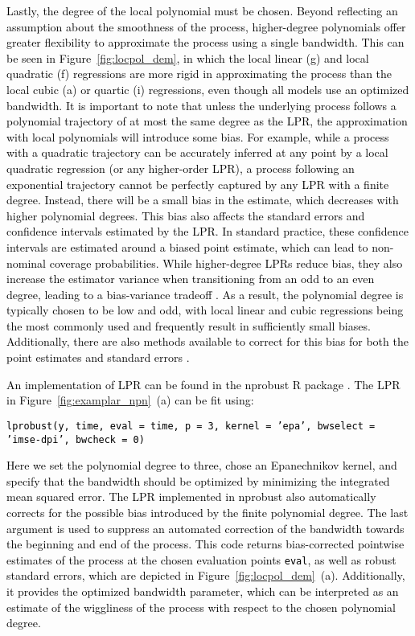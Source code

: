 \documentclass[man, floatsintext]{apa7}
\begin{document}
\textcolor{black}{
  Lastly, the degree of the local polynomial must be chosen. Beyond reflecting
  an assumption about the smoothness of the process, higher-degree polynomials
  offer greater flexibility to approximate the process using a single
  bandwidth. This can be seen in Figure~\ref{fig:locpol_dem}, in which the
  local linear (g) and local quadratic (f) regressions are more rigid in
  approximating the process than the local cubic (a) or quartic (i)
  regressions, even though all models use an optimized bandwidth. It is
  important to note that unless the underlying process follows a polynomial
  trajectory of at most the same degree as the LPR, the approximation with
  local polynomials will introduce some bias. For example, while a process with
  a quadratic trajectory can be accurately inferred at any point by a local
  quadratic regression (or any higher-order LPR), a process following an
  exponential trajectory cannot be perfectly captured by any LPR with a finite
  degree. Instead, there will be a small bias in the estimate, which decreases
  with higher polynomial degrees. This bias also affects the
  standard errors and confidence intervals estimated by the LPR\@. In standard
  practice, these confidence intervals are estimated around a biased point
  estimate, which can lead to non-nominal coverage probabilities. While
  higher-degree LPRs reduce bias, they also increase the estimator variance
  when transitioning from an odd to an even degree, leading to a bias-variance
  tradeoff \parencite{ruppert_multivariate_1994}. As a result, the polynomial
  degree is typically chosen to be low and odd, with local linear and cubic
  regressions being the most commonly used and frequently result in
  sufficiently small biases. Additionally, there are also methods available
  to correct for this bias for both the point estimates and standard errors
  \parencite{R-nprobust}.
}

\textcolor{black}{
  An implementation of LPR can be found in the nprobust R package
  \parencite{R-nprobust}. The LPR in Figure~\ref{fig:examplar_npn}~(a) can be
  fit
  using:}

\noindent
\textcolor{black}{\fontsize{10}{12}\selectfont\texttt{lprobust(y, time, eval =
    time, p = 3, kernel = 'epa', bwselect = 'imse-dpi', bwcheck = 0)}}

\noindent\textcolor{black}{Here we set the polynomial degree to three, chose an
  Epanechnikov kernel, and specify that the bandwidth should be optimized by
  minimizing the integrated mean squared error. The LPR implemented in nprobust
  also automatically corrects for the possible bias introduced by the finite
  polynomial degree. The last argument is used to suppress an automated
  correction of the bandwidth towards the beginning and end of the process.
  This code returns bias-corrected pointwise estimates of the process at the
  chosen evaluation points {\fontsize{10}{12}\selectfont\texttt{eval}}, as well
  as robust standard errors, which are depicted in
  Figure~\ref{fig:locpol_dem}~(a). Additionally, it provides the optimized
  bandwidth parameter, which can
  be interpreted as an estimate of the wiggliness of the process with respect
  to the chosen polynomial degree.
}
\end{document}
